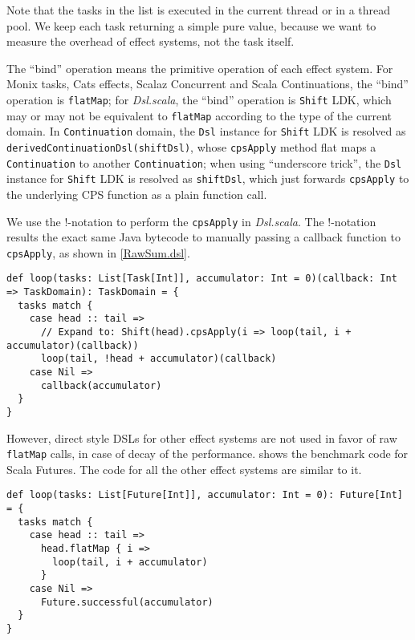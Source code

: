 Note that the tasks in the list is executed in the current thread or in a thread pool. We keep each task returning a simple pure value, because we want to measure the overhead of effect systems, not the task itself.

The ``bind'' operation means the primitive operation of each effect system. For Monix tasks, Cats effects, Scalaz Concurrent and Scala Continuations, the ``bind'' operation is \lstinline{flatMap}; for \textit{Dsl.scala}, the ``bind'' operation is \lstinline{Shift} LDK, which may or may not be equivalent to \lstinline{flatMap} according to the type of the current domain. In \lstinline{Continuation} domain, the \lstinline{Dsl} instance for \lstinline{Shift} LDK is resolved as \lstinline{derivedContinuationDsl(shiftDsl)}, whose \lstinline{cpsApply} method flat maps a \lstinline{Continuation} to another \lstinline{Continuation}; when using ``underscore trick'', the \lstinline{Dsl} instance for \lstinline{Shift} LDK is resolved as \lstinline{shiftDsl}, which just forwards \lstinline{cpsApply} to the underlying CPS function as a plain function call.

We use the !-notation to perform the \lstinline{cpsApply} in \textit{Dsl.scala}. The !-notation results the exact same Java bytecode to manually passing a callback function to \lstinline{cpsApply}, as shown in \cref{RawSum.dsl}.

\begin{lstlisting}[float=htbp,caption={The most efficient implementation of sum based on ordinary CPS function},label={RawSum.dsl}]
def loop(tasks: List[Task[Int]], accumulator: Int = 0)(callback: Int => TaskDomain): TaskDomain = {
  tasks match {
    case head :: tail =>
      // Expand to: Shift(head).cpsApply(i => loop(tail, i + accumulator)(callback))
      loop(tail, !head + accumulator)(callback)
    case Nil =>
      callback(accumulator)
  }
}
\end{lstlisting}

However, direct style DSLs for other effect systems are not used in favor of raw \lstinline{flatMap} calls, in case of decay of the performance.  shows the benchmark code for Scala Futures. The code for all the other effect systems are similar to it.

\begin{lstlisting}[float=htbp,caption={The most efficient implementation of sum based on Scala Futures},label={RawSum.future}]
def loop(tasks: List[Future[Int]], accumulator: Int = 0): Future[Int] = {
  tasks match {
    case head :: tail =>
      head.flatMap { i =>
        loop(tail, i + accumulator)
      }
    case Nil =>
      Future.successful(accumulator)
  }
}
\end{lstlisting}

